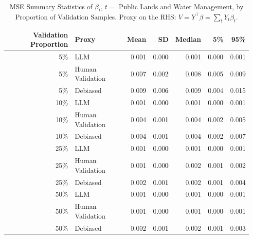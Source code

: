 \begin{table}

\caption{\label{tab:unnamed-chunk-1}MSE Summary Statistics of $\beta_{t}$, $t=$ Public Lands and Water Management, by Proportion of Validation Samples.
      Proxy on the RHS: $V = Y^\top \beta = \sum_{t} Y_t \beta_t$.}
\centering
\begin{tabular}[t]{rlrrrrr}
\toprule
Validation Proportion & Proxy & Mean & SD & Median & 5\% & 95\%\\
\midrule
5\% & LLM & 0.001 & 0.000 & 0.001 & 0.000 & 0.001\\
5\% & Human Validation & 0.007 & 0.002 & 0.008 & 0.005 & 0.009\\
5\% & Debiased & 0.009 & 0.006 & 0.009 & 0.004 & 0.015\\
10\% & LLM & 0.001 & 0.000 & 0.001 & 0.000 & 0.001\\
10\% & Human Validation & 0.004 & 0.001 & 0.004 & 0.002 & 0.005\\
10\% & Debiased & 0.004 & 0.001 & 0.004 & 0.002 & 0.007\\
25\% & LLM & 0.001 & 0.000 & 0.001 & 0.000 & 0.001\\
25\% & Human Validation & 0.001 & 0.000 & 0.002 & 0.001 & 0.002\\
25\% & Debiased & 0.002 & 0.001 & 0.002 & 0.001 & 0.004\\
50\% & LLM & 0.001 & 0.000 & 0.001 & 0.000 & 0.001\\
50\% & Human Validation & 0.001 & 0.000 & 0.001 & 0.000 & 0.001\\
50\% & Debiased & 0.002 & 0.001 & 0.002 & 0.001 & 0.003\\
\bottomrule
\end{tabular}
\end{table}
